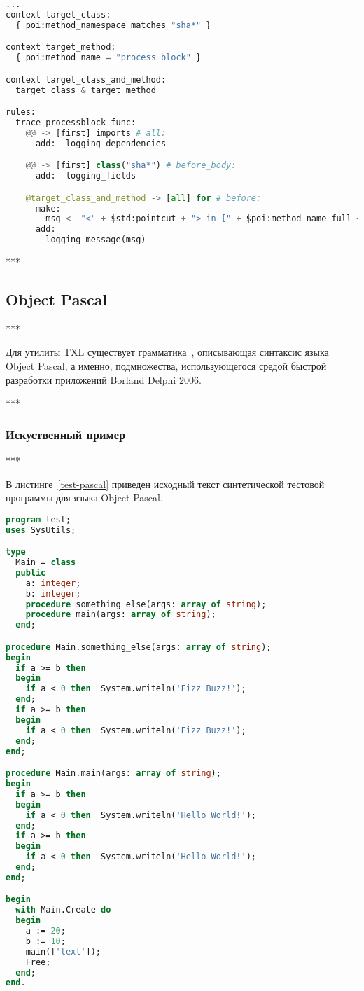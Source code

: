 \begin{lstlisting}[frame=single, language=Python, label={test-rules-c}, caption={Описание правил инструментирования. C++-проект.}]
...
context target_class:
  { poi:method_namespace matches "sha*" }

context target_method:
  { poi:method_name = "process_block" }

context target_class_and_method:
  target_class & target_method

rules:
  trace_processblock_func:
    @@ -> [first] imports # all:
      add:  logging_dependencies

    @@ -> [first] class("sha*") # before_body:
      add:  logging_fields

    @target_class_and_method -> [all] for # before:
      make:
        msg <- "<" + $std:pointcut + "> in [" + $poi:method_name_full + "] method";
      add:
        logging_message(msg)
\end{lstlisting}

***

\subsection{Object Pascal}

***

Для утилиты TXL существует грамматика~\cite{txl-resources}, описывающая синтаксис языка Object Pascal, а именно, подмножества, использующегося средой быстрой разработки приложений Borland Delphi 2006.

***

\subsubsection{Искуственный пример}

***

В листинге~\ref{test-pascal} приведен исходный текст синтетической тестовой программы для языка Object Pascal.

\begin{lstlisting}[frame=single, language=Pascal, label={test-pascal}, caption={Исходный текст тестового приложения.}]
program test;
uses SysUtils;

type
  Main = class
  public
    a: integer;
    b: integer;
    procedure something_else(args: array of string);
    procedure main(args: array of string);
  end;

procedure Main.something_else(args: array of string);
begin
  if a >= b then
  begin
    if a < 0 then  System.writeln('Fizz Buzz!');
  end;
  if a >= b then
  begin
    if a < 0 then  System.writeln('Fizz Buzz!');
  end;
end;

procedure Main.main(args: array of string);
begin
  if a >= b then
  begin
    if a < 0 then  System.writeln('Hello World!');
  end;
  if a >= b then
  begin
    if a < 0 then  System.writeln('Hello World!');
  end;
end;

begin
  with Main.Create do
  begin
    a := 20;
    b := 10;
    main(['text']);
    Free;
  end;
end.
\end{lstlisting}


